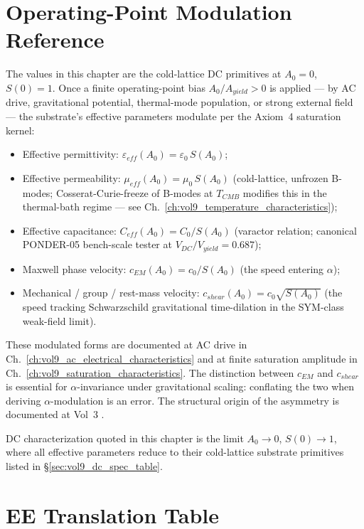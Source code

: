 \section{Operating-Point Modulation Reference}
\label{sec:vol9_dc_operating_point_reference}

The values in this chapter are the cold-lattice DC primitives at $A_0 = 0$, $S(0) = 1$. Once a finite operating-point bias $A_0/A_{yield} > 0$ is applied --- by AC drive, gravitational potential, thermal-mode population, or strong external field --- the substrate's effective parameters modulate per the Axiom~4 saturation kernel:

\begin{itemize}
    \item Effective permittivity: $\varepsilon_{eff}(A_0) = \varepsilon_0\,S(A_0)$;
    \item Effective permeability: $\mu_{eff}(A_0) = \mu_0\,S(A_0)$ (cold-lattice, unfrozen B-modes; Cosserat-Curie-freeze of B-modes at $T_{CMB}$ modifies this in the thermal-bath regime --- see Ch.~\ref{ch:vol9_temperature_characteristics});
    \item Effective capacitance: $C_{eff}(A_0) = C_0/S(A_0)$ (varactor relation; canonical PONDER-05 bench-scale tester at $V_{DC}/V_{yield} = 0.687$);
    \item Maxwell phase velocity: $c_{EM}(A_0) = c_0/S(A_0)$ (the speed entering $\alpha$);
    \item Mechanical / group / rest-mass velocity: $c_{shear}(A_0) = c_0\sqrt{S(A_0)}$ (the speed tracking Schwarzschild gravitational time-dilation in the SYM-class weak-field limit).
\end{itemize}

These modulated forms are documented at AC drive in Ch.~\ref{ch:vol9_ac_electrical_characteristics} and at finite saturation amplitude in Ch.~\ref{ch:vol9_saturation_characteristics}. The distinction between $c_{EM}$ and $c_{shear}$ is essential for $\alpha$-invariance under gravitational scaling: conflating the two when deriving $\alpha$-modulation is an error. The structural origin of the asymmetry is documented at Vol~3 .

DC characterization quoted in this chapter is the limit $A_0 \to 0$, $S(0) \to 1$, where all effective parameters reduce to their cold-lattice substrate primitives listed in \S\ref{sec:vol9_dc_spec_table}.

\section{EE Translation Table}
\label{sec:vol9_dc_ee_translation_table}

